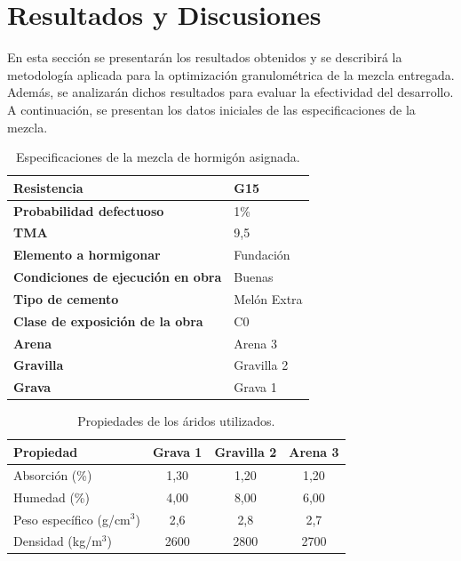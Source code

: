 \section{Resultados y Discusiones}

En esta sección se presentarán los resultados obtenidos y se describirá la metodología aplicada para la optimización granulométrica de la mezcla entregada. Además, se analizarán dichos resultados para evaluar la efectividad del desarrollo. A continuación, se presentan los datos iniciales de las especificaciones de la mezcla.

\begin{table}[H]
\centering
\caption{Especificaciones de la mezcla de hormigón asignada.}
\begin{tabular}{|l|l|}
\hline
\textbf{Resistencia} & G15 \\ \hline
\textbf{Probabilidad defectuoso} & 1\% \\ \hline
\textbf{TMA} & 9,5 \\ \hline
\textbf{Elemento a hormigonar} & Fundación \\ \hline
\textbf{Condiciones de ejecución en obra} & Buenas \\ \hline
\textbf{Tipo de cemento} & Melón Extra \\ \hline
\textbf{Clase de exposición de la obra} & C0 \\ \hline
\textbf{Arena} & Arena 3 \\ \hline
\textbf{Gravilla} & Gravilla 2 \\ \hline
\textbf{Grava} & Grava 1 \\ \hline
\end{tabular}
\end{table}

\begin{table}[H]
\centering
\caption{Propiedades de los áridos utilizados.}
\begin{tabular}{|l|c|c|c|}
\hline
\textbf{Propiedad} & \textbf{Grava 1} & \textbf{Gravilla 2} & \textbf{Arena 3} \\ \hline
Absorción (\%)              & 1,30 & 1,20 & 1,20 \\ \hline
Humedad (\%)                & 4,00 & 8,00 & 6,00 \\ \hline
Peso específico (g/cm$^3$)  & 2,6  & 2,8  & 2,7  \\ \hline
Densidad (kg/m$^3$)         & 2600 & 2800 & 2700 \\ \hline
\end{tabular}
\end{table}

